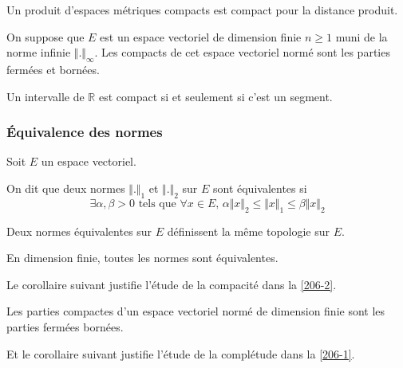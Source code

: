   \begin{proposition}
    Un produit d'espaces métriques compacts est compact pour la distance produit.
  \end{proposition}

  \begin{proposition}
    On suppose que $E$ est un espace vectoriel de dimension finie $n \geq 1$ muni de la norme infinie $\Vert . \Vert_\infty$. Les compacts de cet espace vectoriel normé sont les parties fermées et bornées.
  \end{proposition}

  \begin{application}
    Un intervalle de $\mathbb{R}$ est compact si et seulement si c'est un segment.
  \end{application}

  \subsubsection{Équivalence des normes}


  Soit $E$ un espace vectoriel.

  \begin{definition}
    On dit que deux normes $\Vert . \Vert_1$ et $\Vert . \Vert_2$ sur $E$ sont équivalentes si
    \[ \exists \alpha, \beta > 0 \text{ tels que } \forall x \in E, \, \alpha \Vert x \Vert_2 \leq \Vert x \Vert_1 \leq \beta \Vert x \Vert_2 \]
  \end{definition}

  \begin{remark}
    Deux normes équivalentes sur $E$ définissent la même topologie sur $E$.
  \end{remark}


  \begin{theorem}
    En dimension finie, toutes les normes sont équivalentes.
  \end{theorem}

  Le corollaire suivant justifie l'étude de la compacité dans la \cref{206-2}.

  \begin{corollary}
    Les parties compactes d'un espace vectoriel normé de dimension finie sont les parties fermées bornées.
  \end{corollary}

  Et le corollaire suivant justifie l'étude de la complétude dans la \cref{206-1}.

